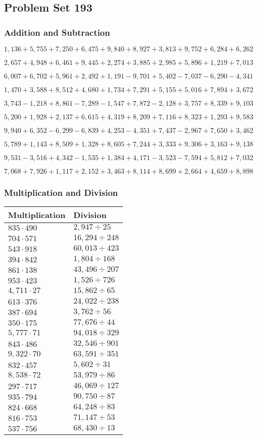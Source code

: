 \hypertarget{problem-set-193}{%
\subsection{Problem Set 193}\label{problem-set-193}}

\hypertarget{addition-and-subtraction}{%
\subsubsection{Addition and
Subtraction}\label{addition-and-subtraction}}

\(1,136+5,755+7,250+6,475+9,840+8,927+3,813+9,752+6,284+6,262\)

\(2,657+4,948+6,461+9,445+2,274+3,885+2,985+5,896+1,219+7,013\)

\(6,007+6,702+5,961+2,492+1,191-9,701+5,402-7,037-6,290-4,341\)

\(1,470+3,588+8,512+4,680+1,734+7,291+5,155+5,016+7,894+3,672\)

\(3,743-1,218+8,861-7,289-1,547+7,872-2,128+3,757+8,339+9,103\)

\(5,200+1,928+2,137+6,615+4,319+8,209+7,116+8,323+1,293+9,583\)

\(9,940+6,352-6,299-6,839+4,253-4,351+7,437-2,967+7,650+3,462\)

\(5,789+1,143+8,509+1,328+8,605+7,244+3,333+9,306+3,163+9,138\)

\(9,531-3,516+4,342-1,535+1,384+4,171-3,523-7,594+5,812+7,032\)

\(7,068+7,926+1,117+2,152+3,463+8,114+8,699+2,664+4,659+8,898\)

\hypertarget{multiplication-and-division}{%
\subsubsection{Multiplication and
Division}\label{multiplication-and-division}}

\begin{longtable}[]{@{}ll@{}}
\toprule
Multiplication & Division\tabularnewline
\midrule
\endhead
\(835\cdot490\) & \(2,947÷25\)\tabularnewline
\(704\cdot571\) & \(16,294÷248\)\tabularnewline
\(543\cdot918\) & \(60,013÷423\)\tabularnewline
\(394\cdot842\) & \(1,804÷168\)\tabularnewline
\(861\cdot138\) & \(43,496÷207\)\tabularnewline
\(953\cdot423\) & \(1,526÷726\)\tabularnewline
\(4,711\cdot27\) & \(15,862÷65\)\tabularnewline
\(613\cdot376\) & \(24,022÷238\)\tabularnewline
\(387\cdot694\) & \(3,762÷56\)\tabularnewline
\(350\cdot175\) & \(77,676÷44\)\tabularnewline
\(5,777\cdot71\) & \(94,018÷329\)\tabularnewline
\(843\cdot486\) & \(32,546÷901\)\tabularnewline
\(9,322\cdot70\) & \(63,591÷351\)\tabularnewline
\(832\cdot457\) & \(5,602÷31\)\tabularnewline
\(8,538\cdot72\) & \(53,979÷86\)\tabularnewline
\(297\cdot717\) & \(46,069÷127\)\tabularnewline
\(935\cdot794\) & \(90,750÷87\)\tabularnewline
\(824\cdot668\) & \(64,248÷83\)\tabularnewline
\(816\cdot753\) & \(71,147÷53\)\tabularnewline
\(537\cdot756\) & \(68,430÷13\)\tabularnewline
\bottomrule
\end{longtable}
